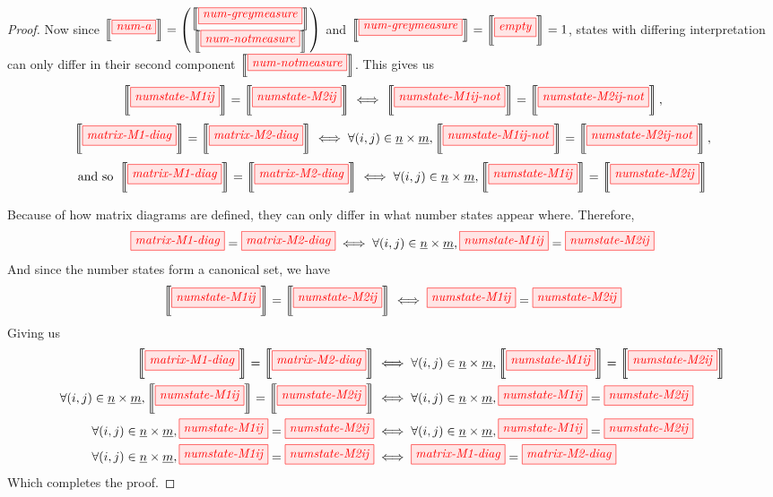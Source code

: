 \begin{proof}
    Now since $\intf{\tikzfig{num-a}} = 
    \begin{pmatrix}
        \intf{\tikzfig{num-greymeasure}} \\
        \intf{\tikzfig{num-notmeasure}}
    \end{pmatrix}$ and $\intf{\tikzfig{num-greymeasure}} =
    \intf{\tikzfig{empty}} = 1$,
    states with differing interpretation can only differ in their second
    component $\intf{\tikzfig{num-notmeasure}}$.  This gives us
    $$
    \intf{\tikzfig{numstate-M1ij}} = \intf{\tikzfig{numstate-M2ij}}
    \iff
    \intf{\tikzfig{numstate-M1ij-not}} = \intf{\tikzfig{numstate-M2ij-not}}
    ,$$
    $$
    \intf{\tikzfig{matrix-M1-diag}} = \intf{\tikzfig{matrix-M2-diag}} 
    \iff
    \forall (i,j) \in \underline{n} \times \underline{m},
    \intf{\tikzfig{numstate-M1ij-not}} = \intf{\tikzfig{numstate-M2ij-not}}
    ,$$
    $$\text{and so }
    \intf{\tikzfig{matrix-M1-diag}} = \intf{\tikzfig{matrix-M2-diag}} \iff
    \forall (i,j) \in \underline{n} \times \underline{m},
    \intf{\tikzfig{numstate-M1ij}} = \intf{\tikzfig{numstate-M2ij}}
    $$

    Because of how matrix diagrams are defined, they can only differ in what
    number states appear where. Therefore,
    $$
    {\tikzfig{matrix-M1-diag}} = {\tikzfig{matrix-M2-diag}} \iff
    \forall (i,j) \in \underline{n} \times \underline{m},
    \tikzfig{numstate-M1ij} = \tikzfig{numstate-M2ij}
    $$
    And since the number states form a canonical set, we have
    $$
    \intf{\tikzfig{numstate-M1ij}} = \intf{\tikzfig{numstate-M2ij}}
    \iff
    \tikzfig{numstate-M1ij} = \tikzfig{numstate-M2ij}$$
    Giving us 
    \begin{align*}
    \intf{\tikzfig{matrix-M1-diag}} = \intf{\tikzfig{matrix-M2-diag}} 
        &\iff
    \forall (i,j) \in \underline{n} \times \underline{m},
    \intf{\tikzfig{numstate-M1ij}} = \intf{\tikzfig{numstate-M2ij}} \\
    \forall (i,j) \in \underline{n} \times \underline{m},
    \intf{\tikzfig{numstate-M1ij}} = \intf{\tikzfig{numstate-M2ij}} 
        &\iff
    \forall (i,j) \in \underline{n} \times \underline{m},
    \tikzfig{numstate-M1ij} = \tikzfig{numstate-M2ij} \\
    \forall (i,j) \in \underline{n} \times \underline{m},
    \tikzfig{numstate-M1ij} = \tikzfig{numstate-M2ij} 
        &\iff
    \forall (i,j) \in \underline{n} \times \underline{m},
    \tikzfig{numstate-M1ij} = \tikzfig{numstate-M2ij} \\
    \forall (i,j) \in \underline{n} \times \underline{m},
    \tikzfig{numstate-M1ij} = \tikzfig{numstate-M2ij} 
        &\iff
    \tikzfig{matrix-M1-diag} = \tikzfig{matrix-M2-diag}
    \end{align*}
    Which completes the proof.


\end{proof}

